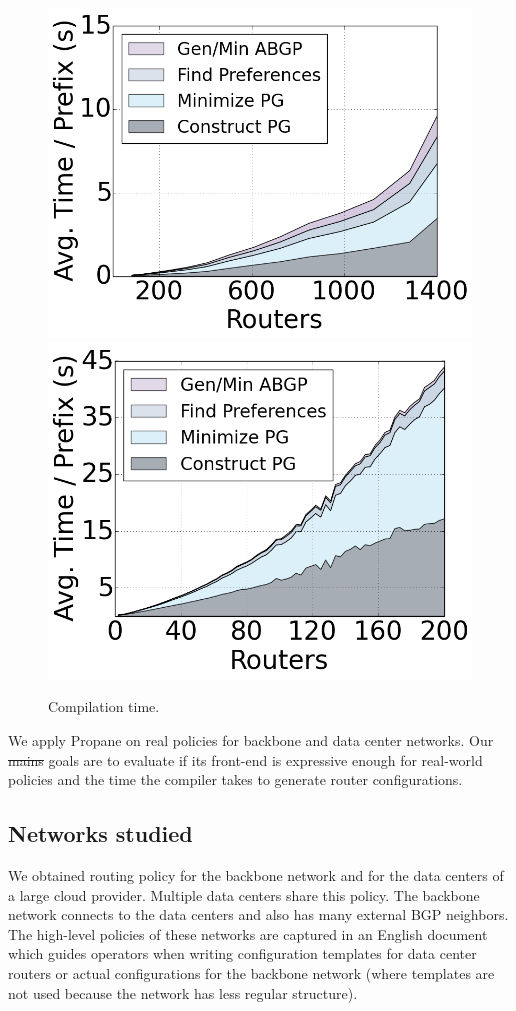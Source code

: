 \documentclass{sig-alternate-10pt}
\newcommand{\sysname}{{\small \sf Propane}\xspace}
\providecommand{\DIFadd}[1]{{\protect\color{blue}\uwave{#1}}} %
\providecommand{\DIFdel}[1]{{\protect\color{red}\sout{#1}}}                      %
\providecommand{\DIFaddbegin}{} %
\providecommand{\DIFaddend}{} %
\providecommand{\DIFdelbegin}{} %
\providecommand{\DIFdelend}{} %
\begin{document}
\DIFaddbegin \begin{figure}
    {\includegraphics[width=.49\columnwidth]{figures/compilation-times-dc.png}}
    {\includegraphics[width=.49\columnwidth]{figures/compilation-times-backbone.png}} \\
  \caption{Compilation time. \label{fig:compilation-times}}
  \vspace{-1em}
\end{figure}

\DIFaddend We apply \sysname on real policies for backbone and data center networks. Our \DIFdelbegin \DIFdel{mains }\DIFdelend \DIFaddbegin \DIFadd{main }\DIFaddend goals are to evaluate if its front-end is expressive enough for real-world policies and the time the compiler takes to generate router configurations.

\subsection{Networks studied}

We obtained routing policy for the backbone network and for the data centers of a large cloud provider. Multiple data centers share this policy. The backbone network connects to the data centers and also has many external BGP neighbors. The high-level policies of these networks are captured in an English document which guides operators when writing configuration templates for data center routers or actual configurations for the backbone network (where templates are not used because the network has less regular structure).
\end{document}
